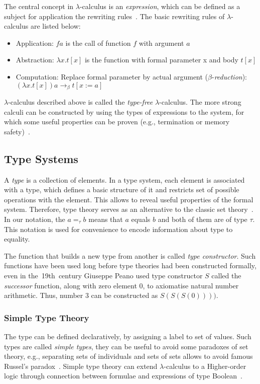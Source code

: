 \documentclass[article]{aaltoseries}
\begin{document}
The central concept in $\lambda$-calculus is an \textit{expression}, which can be defined as a subject for application the rewriting rules~\cite{Bar88}. The basic rewriting rules of $\lambda$-calculus are listed below:

\begin{itemize}
\itemsep0em
	\item Application:
	$f a$ is the call of function $f$ with argument $a$
	
	\item Abstraction:
	$\lambda x.t[x]$ is the function with formal parameter x and body $t[x]$
	
	\item Computation:
	Replace formal parameter by actual argument ($\beta$-\textit{reduction}): \\
	$(\lambda x.t[x]) a \rightarrow_{\beta} t[x:=a]$
\end{itemize}

$\lambda$-calculus described above is called the \textit{type-free} $\lambda$-calculus. The more strong calculi can be constructed by using the types of expressions to the system, for which some useful properties can be proven (e.g., termination or memory safety)~\cite{Bar13}.

\subsection{Type Systems}

A \textit{type} is a collection of elements. In a type system, each element is associated with a type, which defines a basic structure of it and restricts set of possible operations with the element. This allows to reveal useful properties of the formal system. Therefore, type theory serves as an alternative to the classic set theory~\cite{Tho91}.
In our notation, the $a =_{\tau} b$ means that $a$ equals $b$ and both of them are of type $\tau$. This notation is used for convenience to encode information about type to equality.

The function that builds a new type from another is called \textit{type constructor}. Such functions have been used long before type theories had been constructed formally, even in the~19th~century Giuseppe Peano used type constructor $S$ called the \textit{successor} function, along with zero element 0, to axiomatise natural number arithmetic. Thus, number 3 can be constructed as $S(S(S(0))))$.


\subsubsection{Simple Type Theory}
The type can be defined declaratively, by assigning a label to set of values. Such types are called \textit{simple types}, they can be useful to avoid some paradoxes of set theory, e.g., separating sets of individuals and sets of sets allows to avoid famous Russel's paradox~\cite{Irv95}. Simple type theory can extend $\lambda$-calculus to a Higher-order logic through connection between formulae and expressions of type Boolean~\cite{Paulson90}.
\end{document}
